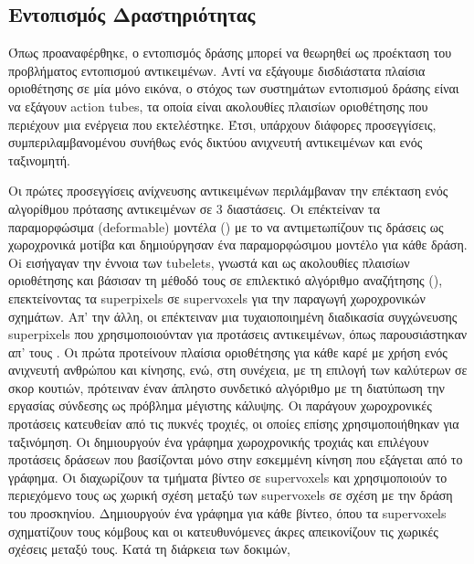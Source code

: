 \subsection{Εντοπισμός Δραστηριότητας}

Όπως προαναφέρθηκε, ο εντοπισμός δράσης μπορεί να θεωρηθεί ως προέκταση του
προβλήματος εντοπισμού αντικειμένων. Αντί να εξάγουμε δισδιάστατα πλαίσια οριοθέτησης  σε μία μόνο
εικόνα, ο στόχος των συστημάτων εντοπισμού δράσης είναι να εξάγουν \en action tubes, \gr τα οποία 
είναι ακολουθίες πλαισίων οριοθέτησης που περιέχουν μια ενέργεια που εκτελέστηκε. Έτσι, υπάρχουν
διάφορες προσεγγίσεις, συμπεριλαμβανομένου συνήθως ενός δικτύου ανιχνευτή αντικειμένων  και ενός ταξινομητή. \par

Οι πρώτες προσεγγίσεις ανίχνευσης αντικειμένων περιλάμβαναν την επέκταση ενός αλγορίθμου  πρότασης αντικειμένων
σε 3 διαστάσεις. Οι \en\cite{6619185} \gr επέκτείναν τα παραμορφώσιμα (\en deformable) \gr μοντέλα (\en\cite{5255236}\gr) με το να αντιμετωπίζουν τις δράσεις  ως
χωροχρονικά μοτίβα και  δημιούργησαν ένα παραμορφώσιμου μοντέλο για κάθε δράση. Oi \en \cite{6909495} \gr εισήγαγαν την έννοια των \en tubelets\gr, γνωστά και ως ακολουθίες
πλαισίων οριοθέτησης και βάσισαν τη μέθοδό τους σε επιλεκτικό αλγόριθμο αναζήτησης (\en\cite{Uijlings13}\gr), επεκτείνοντας τα \en superpixels \gr σε \en supervoxels \gr
για την παραγωγή χωροχρονικών σχημάτων. Απ' την άλλη, οι \en \cite{Oneata} \gr επέκτειναν  μια τυχαιοποιημένη διαδικασία συγχώνευσης \en superpixels \gr 
που χρησιμοποιούνταν  για προτάσεις  αντικειμένων, όπως παρουσιάστηκαν απ' τους \en \cite{Manen:2013:POP:2586117.2587333}\gr.
Οι \en\cite{7298735} \gr  πρώτα προτείνουν πλαίσια οριοθέτησης για κάθε καρέ με χρήση ενός ανιχνευτή ανθρώπου  και κίνησης, ενώ, στη συνέχεια, με τη επιλογή των καλύτερων σε σκορ κουτιών,
πρότειναν έναν άπληστο συνδετικό αλγόριθμο με τη διατύπωση την εργασίας σύνδεσης ως  πρόβλημα  μέγιστης κάλυψης. Οι \en \cite{BMVC2015_177} \gr παράγουν  χωροχρονικές προτάσεις κατευθείαν
από τις πυκνές τροχιές, οι οποίες επίσης χρησιμοποιήθηκαν για ταξινόμηση.
Οι \en\cite{7410734} \gr δημιουργούν ένα γράφημα χωροχρονικής τροχιάς και επιλέγουν προτάσεις δράσεων που βασίζονται μόνο στην εσκεμμένη κίνηση που εξάγεται από το γράφημα.
Οι \en\cite{7410732} \gr διαχωρίζουν  τα τμήματα βίντεο σε \en supervoxels \gr και  χρησιμοποιούν το περιεχόμενο τους ως χωρική σχέση μεταξύ των \en supervoxels \gr σε σχέση με την δράση του προσκηνίου.
Δημιουργούν ένα γράφημα για κάθε βίντεο, όπου τα \en supervoxels \gr σχηματίζουν τους κόμβους και οι  κατευθυνόμενες άκρες απεικονίζουν  τις χωρικές σχέσεις μεταξύ τους. Κατά τη διάρκεια των δοκιμών,

